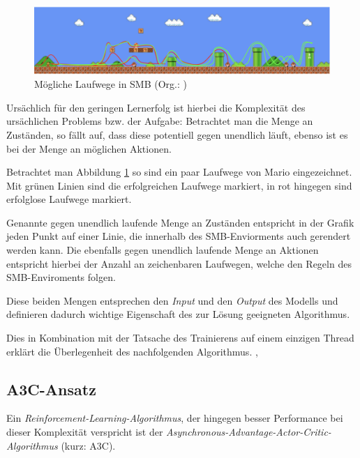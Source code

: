 \documentclass[sigconf,nonacm]{acmart}
\begin{document}
\begin{figure}[hbt!]
\includegraphics[width=\columnwidth]{smb_routes.png}
\caption{Mögliche Laufwege in SMB (Org.: \cite{smbroutes})}
\label{fig:smbroutes}
\end{figure}

Ursächlich für den geringen Lernerfolg ist hierbei die Komplexität des ursächlichen Problems bzw. der Aufgabe: Betrachtet man die Menge an Zuständen, so fällt auf, dass diese potentiell gegen unendlich läuft, ebenso ist es bei der Menge an möglichen Aktionen. 

Betrachtet man Abbildung \ref{fig:smbroutes} so sind ein paar Laufwege von Mario eingezeichnet. Mit grünen Linien sind die erfolgreichen Laufwege markiert, in rot hingegen sind erfolglose Laufwege markiert.

Genannte gegen unendlich laufende Menge an Zuständen entspricht in der Grafik jeden Punkt auf einer Linie, die innerhalb des SMB-Enviorments auch gerendert werden kann. Die ebenfalls gegen unendlich laufende Menge an Aktionen entspricht hierbei der Anzahl an zeichenbaren Laufwegen, welche den Regeln des SMB-Enviroments folgen. 

Diese beiden Mengen entsprechen den \textit{Input} und den \textit{Output} des Modells und definieren dadurch wichtige Eigenschaft des zur Lösung geeigneten Algorithmus.

Dies in Kombination mit der Tatsache des Trainierens auf einem einzigen Thread erklärt die Überlegenheit des nachfolgenden Algorithmus. \cite{dqnmedium}, \cite{ddqndatascience}

\subsection{A3C-Ansatz}
\label{a3c}

Ein \textit{Reinforcement-Learning-Algorithmus}, der hingegen besser Performance bei dieser Komplexität verspricht ist der \textit{Asynchronous-Advantage-Actor-Critic-Algorithmus} (kurz: A3C).
\end{document}

